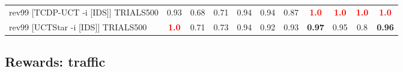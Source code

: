 \documentclass{article}
\begin{document}
\begin{tabular}{|l|r@{$\pm$}rr@{$\pm$}rr@{$\pm$}rr@{$\pm$}rr@{$\pm$}rr@{$\pm$}rr@{$\pm$}rr@{$\pm$}rr@{$\pm$}rr@{$\pm$}r|}
\\
\hline
rev99 [TCDP-UCT -i [IDS]] TRIALS500
& \multicolumn{2}{c}{0.93}
& \multicolumn{2}{c}{0.68}
& \multicolumn{2}{c}{0.71}
& \multicolumn{2}{c}{0.94}
& \multicolumn{2}{c}{0.94}
& \multicolumn{2}{c}{0.87}
& \multicolumn{2}{c}{\textbf{\textcolor{red}{1.0}}}
& \multicolumn{2}{c}{\textbf{\textcolor{red}{1.0}}}
& \multicolumn{2}{c}{\textbf{\textcolor{red}{1.0}}}
& \multicolumn{2}{c|}{\textbf{\textcolor{red}{1.0}}}
\\
rev99 [UCTStar -i [IDS]] TRIALS500
& \multicolumn{2}{c}{\textbf{\textcolor{red}{1.0}}}
& \multicolumn{2}{c}{0.71}
& \multicolumn{2}{c}{0.73}
& \multicolumn{2}{c}{0.94}
& \multicolumn{2}{c}{0.92}
& \multicolumn{2}{c}{0.93}
& \multicolumn{2}{c}{\textbf{0.97}}
& \multicolumn{2}{c}{0.95}
& \multicolumn{2}{c}{0.8}
& \multicolumn{2}{c|}{\textbf{0.96}}
\\
\hline
\end{tabular}%

\bigskip

\subsection*{Rewards: traffic}
\end{document}
